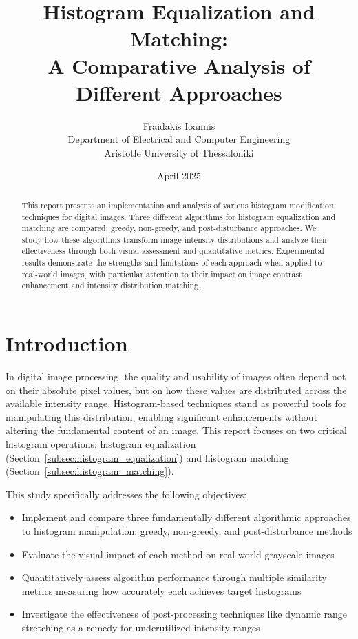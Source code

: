 \documentclass[12pt,a4paper]{article}
\title{\Large \textbf{Histogram Equalization and Matching:\\A Comparative Analysis of Different Approaches}}
\author{Fraidakis Ioannis\\
\small Department of Electrical and Computer Engineering\\
\small Aristotle University of Thessaloniki}
\date{April 2025}
\begin{document}
\maketitle

\begin{abstract}
This report presents an implementation and analysis of various histogram modification techniques for digital images. Three different algorithms for histogram equalization and matching are compared: greedy, non-greedy, and post-disturbance approaches. We study how these algorithms transform image intensity distributions and analyze their effectiveness through both visual assessment and quantitative metrics. Experimental results demonstrate the strengths and limitations of each approach when applied to real-world images, with particular attention to their impact on image contrast enhancement and intensity distribution matching.
\end{abstract}

\section{Introduction}

In digital image processing, the quality and usability of images often depend not on their absolute pixel values, but on how these values are distributed across the available intensity range. Histogram-based techniques stand as powerful tools for manipulating this distribution, enabling significant enhancements without altering the fundamental content of an image. This report focuses on two critical histogram operations: histogram equalization (Section~\ref{subsec:histogram_equalization}) and histogram matching (Section~\ref{subsec:histogram_matching}).

This study specifically addresses the following objectives:

\begin{itemize}
    \item Implement and compare three fundamentally different algorithmic approaches to histogram manipulation: greedy, non-greedy, and post-disturbance methods
    \item Evaluate the visual impact of each method on real-world grayscale images
    \item Quantitatively assess algorithm performance through multiple similarity metrics measuring how accurately each achieves target histograms
    \item Investigate the effectiveness of post-processing techniques like dynamic range stretching as a remedy for underutilized intensity ranges
\end{itemize}
\end{document}
